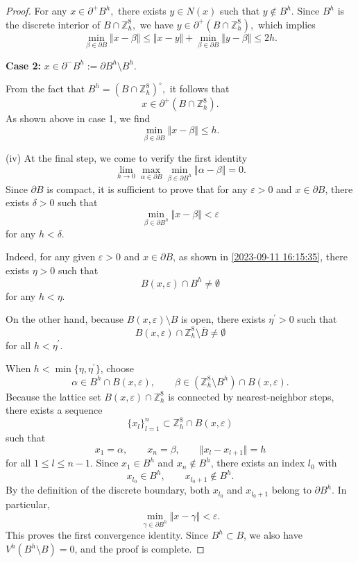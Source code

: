 \documentclass[10pt,a4paper]{amsart}
\newcommand{\Z}{\mathbb Z}
\newcommand{\p}{\partial}
\begin{document}
\begin{proof}
    For any $x\in \p^+ B^h,$ there exists $y\in N(x)$ such that $y\notin B^h$. Since $B^h$ is the discrete interior of $B\cap \Z^8_h,$ we have $y\in \p^+(B\cap \Z^8_h),$ which implies \[
\min_{\beta \in \p B}\Vert x-\beta \Vert \leqslant \Vert x-y\Vert +\min_{\beta\in \p B}\Vert y-\beta \Vert \leqslant 2h.
\]

    \bigskip
   {\bf  Case 2: } $x\in \p^-B^h:=\p B^h\setminus B^h.$

    \bigskip
    From the fact that $B^h=(B\cap \Z^8_h)^\circ,$ it follows that \[
x\in \p^+(B\cap \Z^8_h).
\] As shown above in case 1, we find \[
\min_{\beta\in \p B} \Vert x-\beta \Vert \leqslant h.
\]

    \bigskip

    (iv) At the final step, we come to verify the first identity \[
\lim_{h\to 0} \max_{\alpha\in \p B }\min_{\beta\in \p B^h} \Vert \alpha-\beta\Vert=0.
\] Since $\p B$ is compact, it is sufficient to prove that for any 	 $\varepsilon>0$  and $x \in\p B$, there exists $\delta>0$ such that \[
\min_{\beta \in \p B^h} \Vert x-\beta \Vert < \varepsilon
\] for any $h<\delta.$

    Indeed, for any given 	$\varepsilon>0$ and $x \in \p B$, as shown in \eqref{2023-09-11 16:15:35}, there exists $\eta>0 $ such that \[
B(x,\varepsilon)\cap B^h\neq \emptyset
\] for any $h<\eta.$

    On the other hand, because $B(x,\varepsilon 	)\setminus B$ is open, there exists $\eta^\prime > 0$ such that \[
B(x,\varepsilon)\cap \Z^8_h\setminus \overline B \neq \emptyset
\]
   for all  $h<\eta^\prime$.

    When $h<\min\{\eta,\eta^\prime\}$, choose
    \[
        \alpha \in B^h\cap B(x,\varepsilon), \qquad \beta \in (\Z_h^8\setminus B^h)\cap B(x,\varepsilon).
    \]
    Because the lattice set \(B(x,\varepsilon)\cap \Z_h^8\) is connected by nearest-neighbor steps, there exists a sequence
    \[
        \{x_l\}_{l=1}^n \subset \Z_h^8 \cap B(x,\varepsilon)
    \]
    such that
    \[
        x_1=\alpha,\qquad x_n=\beta,\qquad \Vert x_l-x_{l+1}\Vert=h
    \]
    for all \(1\le l\le n-1\). Since \(x_1\in B^h\) and \(x_n\notin B^h\), there exists an index \(l_0\) with
    \[
        x_{l_0}\in B^h,\qquad x_{l_0+1}\notin B^h.
    \]
    By the definition of the discrete boundary, both \(x_{l_0}\) and \(x_{l_0+1}\) belong to \(\p B^h\). In particular,
    \[
        \min_{\gamma\in \p B^h}\Vert x-\gamma\Vert<\varepsilon.
    \]
    This proves the first convergence identity. Since \(B^h\subset B\), we also have \(V^h(B^h\setminus B)=0\), and the proof is complete.




\end{proof}
\end{document}
